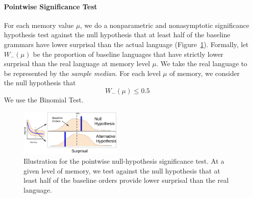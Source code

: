 \documentclass[11pt,letterpaper]{article}
\begin{document}


\paragraph{Pointwise Significance Test}
For each memory value $\mu$, we do a nonparametric and nonasymptotic significance hypothesis test against the null hypothesis that at least half of the baseline grammars have lower surprisal than the actual language (Figure~\ref{fig:nhst-pointwise}).
Formally, let $W_-(\mu)$ be the proportion of baseline languages that have strictly lower surprisal than the real language at memory level $\mu$.
We take the real language to be represented by the \emph{sample median}.
For each level $\mu$ of memory, we consider the null hypothesis that
\begin{equation}
	W_-(\mu) \leq 0.5
\end{equation}
We use the Binomial Test.




\begin{figure}
	\begin{center}
\includegraphics[width=0.45\textwidth]{figures/nhst.png}
\end{center}
	\caption{Illustration for the pointwise null-hypothesis significance test. At a given level of memory, we test against the null hypothesis that at least half of the baseline orders provide lower surprisal than the real language.}\label{fig:nhst-pointwise}
\end{figure}






\end{document}
